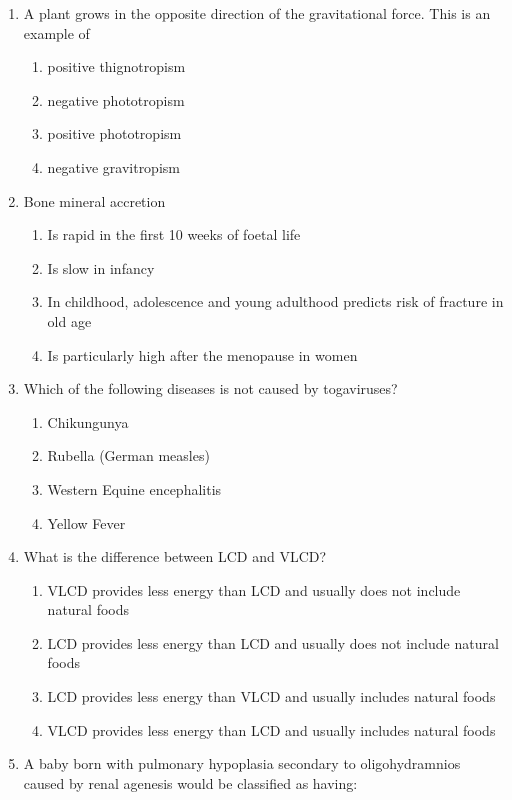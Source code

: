 \documentclass[12pt]{article}
\begin{document}
\begin{enumerate}[label=\arabic*.]
\begin{enumerate}[label=(\alph*)]
\end{enumerate}
\item A plant grows in the opposite direction of the gravitational force. This is an example of
\begin{enumerate}[label=(\alph*)]
    \item positive thignotropism
    \item negative phototropism
    \item positive phototropism
    \item negative gravitropism
\end{enumerate}
\item Bone mineral accretion
\begin{enumerate}[label=(\alph*)]
    \item Is rapid in the first 10 weeks of foetal life
    \item Is slow in infancy
    \item In childhood, adolescence and young adulthood predicts risk of fracture in old age
    \item Is particularly high after the menopause in women
\end{enumerate}
\item Which of the following diseases is not caused by togaviruses?
\begin{enumerate}[label=(\alph*)]
    \item Chikungunya
    \item Rubella (German measles)
    \item Western Equine encephalitis
    \item Yellow Fever
\end{enumerate}
\item What is the difference between LCD and VLCD?
\begin{enumerate}[label=(\alph*)]
    \item VLCD provides less energy than LCD and usually does not include natural foods
    \item LCD provides less energy than LCD and usually does not include natural foods
    \item LCD provides less energy than VLCD and usually includes natural foods
    \item VLCD provides less energy than LCD and usually includes natural foods
\end{enumerate}
\item A baby born with pulmonary hypoplasia secondary to oligohydramnios caused by renal agenesis would be classified as having:

\end{enumerate}
\end{document}
